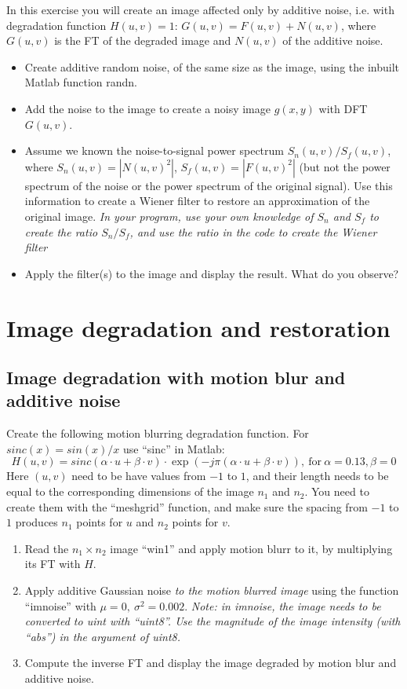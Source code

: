 \documentclass[a4paper]{article}
\begin{document}
In this exercise you will create an image affected only by additive noise, i.e. with degradation function $H(u,v) = 1$:
$G(u,v)= F(u,v)+N(u,v)$, where $G(u,v)$ is the FT of the degraded image and $N(u,v)$ of the additive noise.
\begin{itemize}
\item Create additive random noise, of the same size as the image, using the inbuilt Matlab function randn.
\item Add the noise to the image to create a noisy image $g(x,y)$ with DFT $G(u,v)$.
\item Assume we known the noise-to-signal power spectrum $S_n(u,v)/S_f(u,v)$, where $S_n(u,v)= |N(u,v)^2|$, $S_f(u,v)= |F(u,v)^2|$ (but not the power spectrum of the noise or the power spectrum of the original signal). Use this information to create a Wiener filter to restore an approximation of the original image. \textit{In your program, use your own knowledge of $S_n$ and $S_f$ to create the ratio $S_n/S_f$, and use the ratio in the code to create the Wiener filter}
\item Apply the filter(s) to the image and display the result. What do you observe?
\end{itemize}


\section{Image degradation and restoration}

\subsection{Image degradation with motion blur and additive noise}

Create the following motion blurring degradation function. For $sinc(x) = sin(x)/x$ use ``sinc'' in Matlab:
$$ H(u,v) = sinc(\alpha \cdot u + \beta \cdot v)\cdot \exp(-j\pi (\alpha \cdot u + \beta \cdot v)),~\textrm{for} ~\alpha = 0.13, \beta = 0  $$
Here $(u,v)$ need to be have values from $-1$ to $1$, and their length needs to be equal to the corresponding dimensions of the image $n_1$ and $n_2$. You need to create them with the ``meshgrid'' function, and make sure the spacing from $-1$ to $1$ produces $n_1$ points for $u$ and $n_2$ points for $v$. 
\begin{enumerate}
\item Read the $n_1 \times n_2$ image ``win1'' and apply motion blurr to it, by multiplying its FT with $H$.
\item Apply additive Gaussian noise \textit{to the motion blurred image} using the function ``imnoise'' with $\mu = 0,~\sigma^2=0.002 $. {\textit{Note: in imnoise, the image needs to be converted to uint with ``uint8''. Use the magnitude of the image intensity (with ``abs'') in the argument of uint8.}}
\item Compute the inverse FT and display the image degraded by motion blur and additive noise.
\end{enumerate}
\end{document}
